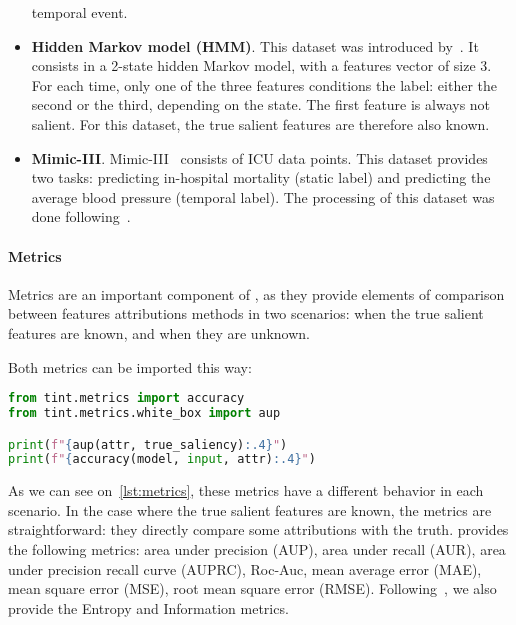 \begin{itemize}
        temporal event.
    \item \textbf{Hidden Markov model (HMM)}.
        This dataset was introduced by~\citep{crabbe2021explaining}.
        It consists in a 2-state hidden Markov model, with a features vector of size 3.
        For each time, only one of the three features conditions the label: either the second or the third, depending
        on the state.
        The first feature is always not salient.
        For this dataset, the true salient features are therefore also known.
    \item \textbf{Mimic-III}.
        Mimic-III~\citep{johnson2016mimic} consists of ICU data points.
        This dataset provides two tasks: predicting in-hospital mortality (static label) and predicting the
        average blood pressure (temporal label).
        The processing of this dataset was done following~\citep{tonekaboni2020went, crabbe2021explaining}.
\end{itemize}


\paragraph{Metrics}

Metrics are an important component of \texttt{}, as they provide elements of comparison
between features attributions methods in two scenarios: when the true salient features are known, and when they are
unknown.

Both metrics can be imported this way:

\begin{lstlisting}[language=Python, caption=Attribution loading example, label={lst:metrics}]
from tint.metrics import accuracy
from tint.metrics.white_box import aup

print(f"{aup(attr, true_saliency):.4}")
print(f"{accuracy(model, input, attr):.4}")
\end{lstlisting}

As we can see on~\ref{lst:metrics}, these metrics have a different behavior in each scenario.
In the case where the true salient features are known, the metrics are straightforward: they directly compare some
attributions with the truth.
\texttt{} provides the following metrics: area under precision (AUP), area under recall (AUR),
area under precision recall curve (AUPRC), Roc-Auc, mean average error (MAE), mean square error (MSE), root mean square
error (RMSE).
Following~\citep{crabbe2021explaining}, we also provide the Entropy and Information metrics.

